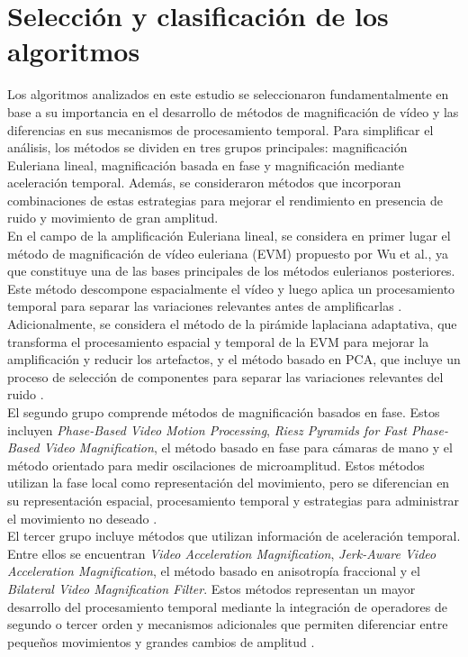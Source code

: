 \section{Selección y clasificación de los algoritmos}

Los algoritmos analizados en este estudio se seleccionaron fundamentalmente en base a su importancia en el desarrollo de métodos de magnificación de vídeo y las diferencias en sus mecanismos de procesamiento temporal. Para simplificar el análisis, los métodos se dividen en tres grupos principales: magnificación Euleriana lineal, magnificación basada en fase y magnificación mediante aceleración temporal. Además, se consideraron métodos que incorporan combinaciones de estas estrategias para mejorar el rendimiento en presencia de ruido y movimiento de gran amplitud.\\


En el campo de la amplificación Euleriana lineal, se considera en primer lugar el método de magnificación de vídeo euleriana (EVM) propuesto por Wu et al., ya que constituye una de las bases principales de los métodos eulerianos posteriores. Este método descompone espacialmente el vídeo y luego aplica un procesamiento temporal para separar las variaciones relevantes antes de amplificarlas \cite{wu2012eulerian}. Adicionalmente, se considera el método de la pirámide laplaciana adaptativa, que transforma el procesamiento espacial y temporal de la EVM para mejorar la amplificación y reducir los artefactos, y el método basado en PCA, que incluye un proceso de selección de componentes para separar las variaciones relevantes del ruido \cite{yang2023adaptive,wu2018pca}.\\



El segundo grupo comprende métodos de magnificación basados en fase. Estos incluyen \textit{Phase-Based Video Motion Processing}, \textit{Riesz Pyramids for Fast Phase-Based Video Magnification}, el método basado en fase para cámaras de mano y el método orientado para medir oscilaciones de microamplitud. Estos métodos utilizan la fase local como representación del movimiento, pero se diferencian en su representación espacial, procesamiento temporal y estrategias para administrar el movimiento no deseado \cite{wadhwa2013phase,wadhwa2014riesz,zang2026phase,yang2024phase}.\\




El tercer grupo incluye métodos que utilizan información de aceleración temporal. Entre ellos se encuentran \textit{Video Acceleration Magnification}, \textit{Jerk-Aware Video Acceleration Magnification}, el método basado en anisotropía fraccional y el \textit{Bilateral Video Magnification Filter}. Estos métodos representan un mayor desarrollo del procesamiento temporal mediante la integración de operadores de segundo o tercer orden y mecanismos adicionales que permiten diferenciar entre pequeños movimientos y grandes cambios de amplitud \cite{zhang2017acceleration,takeda2018jerk,takeda2019wild,takeda2022bilateral}.\\



